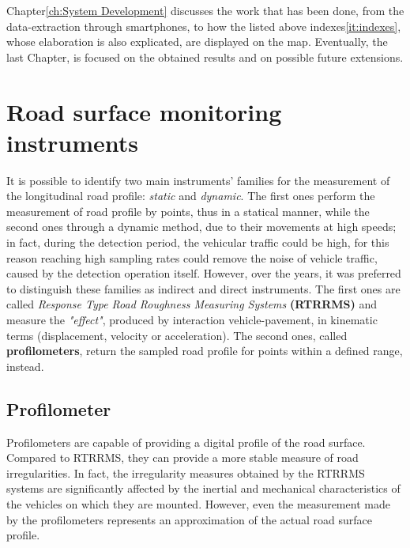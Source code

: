 \documentclass[tesi]{subfiles}
\begin{document}
Chapter\ref{ch:System Development} discusses the work that has been done, from the data-extraction through smartphones, to how the listed above indexes\ref{it:indexes}, whose elaboration is also explicated, are displayed on the map.
Eventually, the last Chapter, is focused on the obtained results and on possible future extensions.
\clearpage
	\section{Road surface monitoring instruments}\label{sc:Instruments}
It is possible to identify two main instruments' families for the measurement of the longitudinal road profile: \emph{static} and \emph{dynamic}. The first ones perform the measurement of road profile by points, thus in a statical manner, while the second ones through a dynamic method, due to their movements at high speeds; in fact, during the detection period, the vehicular traffic could be high, for this reason reaching high sampling rates could remove the noise of vehicle traffic, caused by the detection operation itself. However, over the years, it was preferred to distinguish these families as indirect and direct instruments.
The first ones are called \textit{Response Type Road Roughness Measuring Systems} \textbf{(RTRRMS)} and measure the \textit{"effect"}, produced by interaction vehicle-pavement, in kinematic terms (displacement, velocity or acceleration). The second ones, called \textbf{profilometers}, return the sampled road profile for points within a defined range, instead.

		\subsection{Profilometer}\label{ssc:profilometers}
Profilometers are capable of providing a digital profile of the road surface. Compared to RTRRMS, they can provide a more stable measure of road irregularities. In fact, the irregularity measures obtained by the RTRRMS systems are significantly affected by the inertial and mechanical characteristics of the vehicles on which they are mounted. However, even the measurement made by the profilometers represents an approximation of the actual road surface profile\cite{sayers1996interpretation}.
\end{document}
